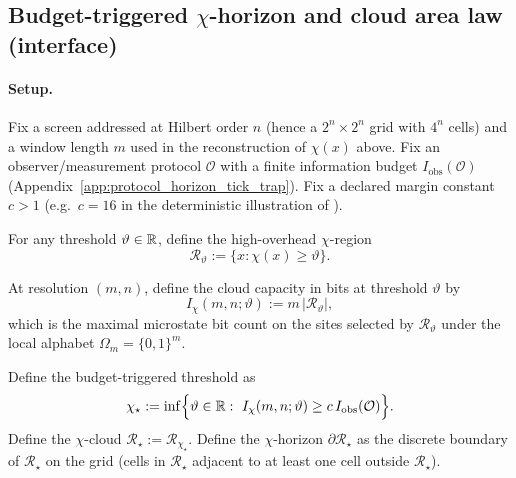 \subsection{Budget-triggered \texorpdfstring{$\chi$}{chi}-horizon and cloud area law (interface)}
\label{subsec:chi_budget_horizon_area_law}

\paragraph{Setup.}
\InterfaceTag Fix a screen addressed at Hilbert order $n$ (hence a $2^n\times 2^n$ grid with $4^n$ cells) and a window length $m$ used in the reconstruction of $\chi(x)$ above.
Fix an observer/measurement protocol $\mathcal O$ with a finite information budget $I_{\mathrm{obs}}(\mathcal O)$ (Appendix~\ref{app:protocol_horizon_tick_trap}).
Fix a declared margin constant $c>1$ (e.g.\ $c=16$ in the deterministic illustration of ).

\begin{definition}\label{def:chi_cloud_region_threshold}
\InterfaceTag For any threshold $\vartheta\in\mathbb{R}$, define the high-overhead $\chi$-region
\[
\mathcal R_{\vartheta}:=\{x:\chi(x)\ge \vartheta\}.
\]
\end{definition}

\begin{definition}\label{def:chi_cloud_capacity_bits}
\InterfaceTag At resolution $(m,n)$, define the cloud capacity in bits at threshold $\vartheta$ by
\[
I_{\chi}(m,n;\vartheta):= m\,|\mathcal R_{\vartheta}|,
\]
which is the maximal microstate bit count on the sites selected by $\mathcal R_{\vartheta}$ under the local alphabet $\Omega_m=\{0,1\}^m$.
\end{definition}

\begin{definition}\label{def:chi_budget_threshold_horizon}
\InterfaceTag Define the budget-triggered threshold as
\[
\chi_\star
:=\inf\Bigl\{\vartheta\in\mathbb{R}:\ I_{\chi}(m,n;\vartheta)\ge c\,I_{\mathrm{obs}}(\mathcal O)\Bigr\}.
\]
Define the $\chi$-cloud $\mathcal R_\star:=\mathcal R_{\chi_\star}$.
Define the $\chi$-horizon $\partial\mathcal R_\star$ as the discrete boundary of $\mathcal R_\star$ on the grid (cells in $\mathcal R_\star$ adjacent to at least one cell outside $\mathcal R_\star$).
\end{definition}

